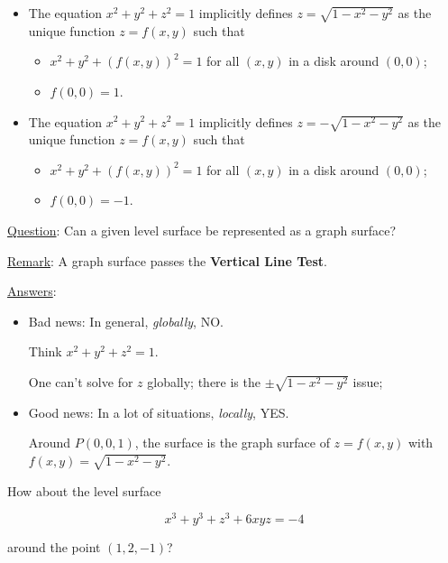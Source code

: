 

\begin{frame}
\begin{itemize}
\item The equation $x^2+y^2+z^2 = 1$ implicitly defines $z=\sqrt{1-x^2 -y^2 }$ as the unique function $z=f(x,y)$ such that

\begin{itemize}
\item $x^2+ y^2+(f(x,y))^2 = 1$ for all $(x,y)$ in a disk around $(0,0)$;
\item $f(0,0) = 1$.
\end{itemize}
\item The equation $x^2+y^2+z^2 = 1$ implicitly defines $z=-\sqrt{1 -x^2- y^2 }$ as the unique function $z=f(x,y)$ such that
%
\begin{itemize}
\item $x^2+ y^2+(f(x,y))^2 = 1$ for all $(x,y)$ in a disk around $(0,0)$;
\item $f(0,0) = -1$.
\end{itemize}
\end{itemize}


\end{frame}

\begin{frame}

\underline{Question}: Can a given level surface be represented as a graph surface?

\pause
\medskip

\underline{Remark}: A graph surface passes the \textbf{Vertical Line Test}.

\pause
\medskip
\underline{Answers}:
\begin{itemize}
  \item \pause Bad news: In general, \emph{globally}, NO.

  \noindent Think $x^2+y^2+z^2= 1$.

  One can't solve for $z$ globally; there is the $\pm\sqrt{1-x^2-y^2}$ issue;
  \item \pause Good news: In a lot of situations, \emph{locally}, YES.

  \noindent Around $P(0,0,1)$, the surface is the graph surface of $z = f(x,y)$ with $f(x,y) =\sqrt{1-x^2-y^2}$.
\end{itemize}

\pause
How about the level surface

$$x^3+y^3+z^3+6xyz =-4$$

around the point $(1,2,-1)$?
\end{frame}
